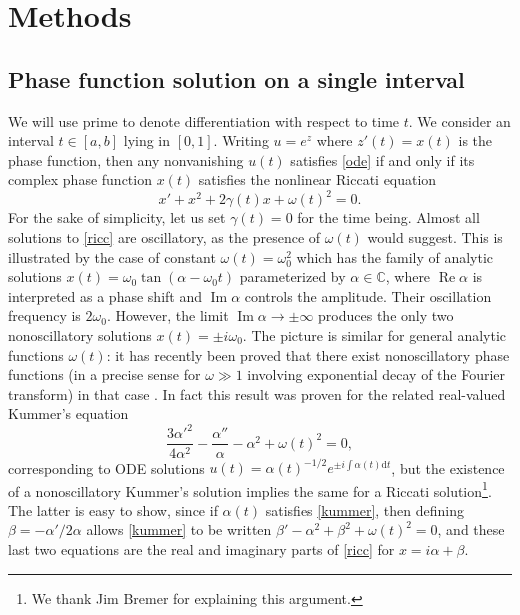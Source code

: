 \documentclass[10pt]{article}
\newcommand{\be}{\begin{equation}}
\newcommand{\ee}{\end{equation}}
\newcommand{\C}{\mathbb{C}}
\renewcommand{\d}{\mathrm{d}} %
\DeclareMathOperator{\im}{Im}
\DeclareMathOperator{\re}{Re}
\newcommand{\om}{\omega}
\newcommand{\g}{\gamma}
\begin{document}

\section{Methods \label{methods}}

\subsection{Phase function solution on a single interval \label{phasefun}}

We will use prime to denote differentiation with respect to time $t$.
We consider an interval $t\in[a,b]$ lying in $[0,1]$.  
Writing $u = e^z$ where $z'(t) = x(t)$ is the phase function,
then any nonvanishing $u(t)$ satisfies \cref{ode} if and only if
its complex phase function $x(t)$ satisfies the nonlinear Riccati equation
\be
x' + x^2 + 2\g(t)x + \om(t)^2 = 0.
\label{ricc}
\ee
For the sake of simplicity, let us set $\g(t) = 0$ for the time being.
Almost all solutions to \cref{ricc} are oscillatory,
as the presence of $\om(t)$ would suggest.
This is illustrated by the case of constant $\om(t) = \om_0^2$ 
which has the family of analytic solutions
$x(t) = \om_0 \tan(\alpha - \om_0t)$ parameterized by $\alpha\in\C$,
where $\re \alpha$ is interpreted as a phase shift and $\im \alpha$
controls the amplitude. Their oscillation frequency is $2\om_0$.
However, the limit $\im \alpha \to \pm \infty$ produces
the only two nonoscillatory solutions $x(t) = \pm i\om_0$.
The picture is similar
for general analytic functions $\om(t)$:
it has recently been proved that there exist nonoscillatory phase functions
(in a precise sense for $\om\gg 1$ involving exponential decay of the Fourier
transform) in that case \cite{heitman2015,bremer2016}.
In fact this result was proven
for the related real-valued Kummer's equation
\be
\frac{3 \alpha'^2}{4\alpha^2} - \frac{\alpha''}{\alpha} - \alpha^2 +
\om(t)^2 = 0,
\label{kummer}
\ee
corresponding to ODE solutions $u(t) = \alpha(t)^{-1/2} e^{\pm i\int \alpha(t) \d t}$,
but the existence of a nonoscillatory Kummer's solution implies the same for
a Riccati solution\footnote{We thank Jim Bremer for explaining this argument.}.
The latter is easy to show, since if $\alpha(t)$ satisfies \cref{kummer},
then defining $\beta = -\alpha'/2\alpha$ allows \cref{kummer}
to be written
$\beta' - \alpha^2 + \beta^2 + \om(t)^2 = 0$, and these last two equations
are the real and imaginary parts of \cref{ricc}
for $x = i\alpha + \beta$.
\end{document}
